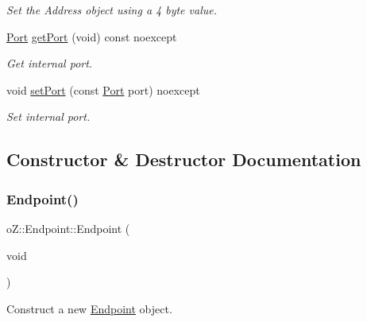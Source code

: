 \begin{DoxyCompactItemize}
\begin{DoxyCompactList}\small\item\em Set the Address object using a 4 byte value. \end{DoxyCompactList}\item 
\mbox{\hyperlink{namespaceo_z_afeccb82d451972ba3b7d2a32b066b30b}{Port}} \mbox{\hyperlink{classo_z_1_1_endpoint_aad983948594b295187d6117f99b1988d}{get\+Port}} (void) const noexcept
\begin{DoxyCompactList}\small\item\em Get internal port. \end{DoxyCompactList}\item 
void \mbox{\hyperlink{classo_z_1_1_endpoint_ab2e2765d1e7d6e40128772ac045872a0}{set\+Port}} (const \mbox{\hyperlink{namespaceo_z_afeccb82d451972ba3b7d2a32b066b30b}{Port}} port) noexcept
\begin{DoxyCompactList}\small\item\em Set internal port. \end{DoxyCompactList}\end{DoxyCompactItemize}


\subsection{Constructor \& Destructor Documentation}
\mbox{\label{classo_z_1_1_endpoint_aa0e46ff6f1b744e9173a97680e2e20a6}} 
\subsubsection{\texorpdfstring{Endpoint()}{Endpoint()}\hspace{0.1cm}{\footnotesize\ttfamily [1/4]}}
{\footnotesize\ttfamily o\+Z\+::\+Endpoint\+::\+Endpoint (\begin{DoxyParamCaption}\item[{void}]{ }\end{DoxyParamCaption})\hspace{0.3cm}{\ttfamily [default]}}



Construct a new \mbox{\hyperlink{classo_z_1_1_endpoint}{Endpoint}} object. 

\mbox{\label{classo_z_1_1_endpoint_ac7c25299f3e5bc05a54e7906d17fbfd9}} 
